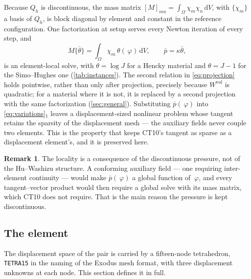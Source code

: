 \documentclass{article}
\newcommand{\disp}{~\varphi}
\newcommand{\diff}{\,\mathrm{d}}
\newcommand{\supvol}{^{\mathrm{vol}}}
\newcommand{\code}[1]{\texttt{#1}}
\theoremstyle{definition}
\newtheorem{remark}{Remark}
\theoremstyle{plain}
\begin{document}
Because $Q_h$ is discontinuous, the mass matrix
$[M]_{mn} = \int_\Omega \chi_m \chi_n \diff V$, with $\{\chi_m\}$ a basis of
$Q_h$, is block diagonal by element and constant in the reference
configuration. One factorization at setup serves
every Newton iteration of every step, and
\begin{equation}
  \label{eq:projection}
  M \{\bar\theta\} = \int_\Omega \chi_m \, \theta(\disp) \diff V,
  \qquad
  \bar p = \kappa \bar\theta ,
\end{equation}
is an element-local solve, with $\theta = \log J$ for a Hencky material and
$\theta = J - 1$ for the Simo--Hughes one (\cref{tab:instances}). The second
relation in \eqref{eq:projection} holds pointwise, rather than only
after projection, precisely because $W\supvol$ is quadratic; for a material
where it is not, it is replaced by a second projection with the same
factorization (\cref{sec:general}). Substituting $\bar p(\disp)$ into
\eqref{eq:variations}$_1$ leaves a displacement-sized nonlinear problem whose
tangent retains the sparsity of the displacement mesh --- the auxiliary fields
never couple two elements. This is the property that keeps CT10's tangent as sparse as a displacement element's, and it is
preserved here.

\begin{remark}
The locality is a consequence of the discontinuous pressure, not of the
Hu--Washizu structure. A conforming auxiliary field --- one requiring
inter-element continuity --- would make $\bar p(\disp)$ a global function of
$\disp$, and every tangent--vector product would then require a global solve
with its mass matrix, which CT10 does not require. That
is the main reason the pressure is kept discontinuous.
\end{remark}

\subsection{The element}
\label{sec:element}

The displacement space of the pair is carried by a fifteen-node
tetrahedron, \code{TETRA15} in the naming of the Exodus mesh format, with
three displacement unknowns at each node. This section defines it in full.
\end{document}
